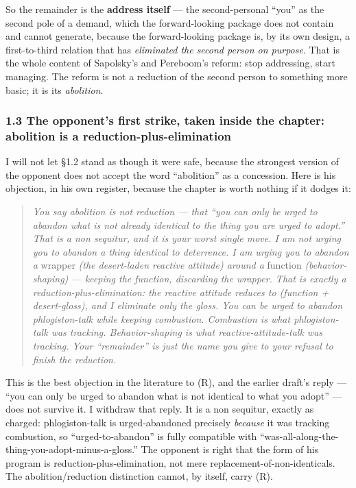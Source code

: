 \documentclass[11pt]{article}
\begin{document}
So the remainder is the \textbf{address itself} — the second-personal ``you'' as the second pole of a demand, which the forward-looking package does not contain and cannot generate, because the forward-looking package is, by its own design, a first-to-third relation that has \emph{eliminated the second person on purpose}. That is the whole content of Sapolsky's and Pereboom's reform: stop addressing, start managing. The reform is not a reduction of the second person to something more basic; it is its \emph{abolition}.

\subsubsection*{1.3 The opponent's first strike, taken inside the chapter: abolition is a reduction-plus-elimination}

I will not let §1.2 stand as though it were safe, because the strongest version of the opponent does not accept the word ``abolition'' as a concession. Here is his objection, in his own register, because the chapter is worth nothing if it dodges it:

\begin{quote}
\emph{You say abolition is not reduction — that ``you can only be urged to abandon what is not already identical to the thing you are urged to adopt.'' That is a non sequitur, and it is your worst single move. I am not urging you to abandon a thing identical to deterrence. I am urging you to abandon a} wrapper \emph{(the desert-laden reactive attitude) around a} function \emph{(behavior-shaping) — keeping the function, discarding the wrapper. That is exactly a reduction-plus-elimination: the reactive attitude reduces to (function + desert-gloss), and I eliminate only the gloss. You can be urged to abandon phlogiston-talk while keeping combustion. Combustion is what phlogiston-talk was tracking. Behavior-shaping is what reactive-attitude-talk was tracking. Your ``remainder'' is just the name you give to your refusal to finish the reduction.}
\end{quote}

This is the best objection in the literature to (R), and the earlier draft's reply — ``you can only be urged to abandon what is not identical to what you adopt'' — does not survive it. I withdraw that reply. It is a non sequitur, exactly as charged: phlogiston-talk is urged-abandoned precisely \emph{because} it was tracking combustion, so ``urged-to-abandon'' is fully compatible with ``was-all-along-the-thing-you-adopt-minus-a-gloss.'' The opponent is right that the form of his program is reduction-plus-elimination, not mere replacement-of-non-identicals. The abolition/\allowbreak{}reduction distinction cannot, by itself, carry (R).
\end{document}
